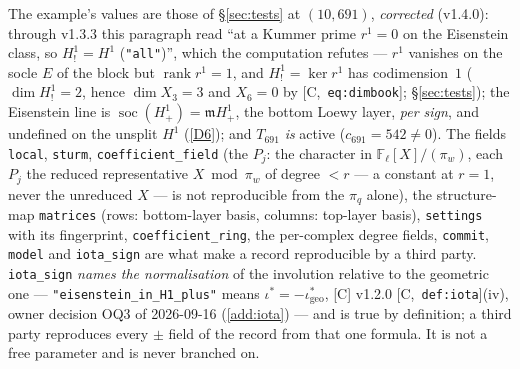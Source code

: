 \documentclass[11pt]{article}
\theoremstyle{remark}
\newcommand{\F}{\mathbb{F}}
\newcommand{\Fl}{\F_\ell}
\DeclareMathOperator{\rank}{rank}
\DeclareMathOperator{\soc}{soc}
\newcommand{\m}{\mathfrak{m}}
\newcommand{\HA}[1]{[C,~\texttt{#1}]}      %
\begin{document}
\noindent The example's values are those of \S\ref{sec:tests} at $(10,691)$, \emph{corrected}
(v1.4.0): through v1.3.3 this paragraph read ``at a Kummer prime $r^1=0$ on the Eisenstein
class, so $H^1_!=H^1$ (\texttt{"all"})'', which the computation refutes --- $r^1$ vanishes on
the socle $E$ of the block but $\rank r^1=1$, and $H^1_!=\ker r^1$ has codimension~$1$
($\dim H^1_!=2$, hence $\dim X_3=3$ and $X_6=0$ by \HA{eq:dimbook}; \S\ref{sec:tests}); the
Eisenstein line is $\soc(H^1_+)=\m H^1_+$, the bottom Loewy layer, \emph{per sign}, and
undefined on the unsplit $H^1$ (\ref{D6}); and $T_{691}$ \emph{is} active ($c_{691}=542\ne0$).
The fields \texttt{local}, \texttt{sturm}, \texttt{coefficient\_field} (the $P_j$: the
character in $\Fl[X]/(\pi_w)$, each $P_j$ the reduced representative $X\bmod\pi_w$ of degree
$<r$ --- a constant at $r=1$, never the unreduced $X$ --- is not reproducible from the $\pi_q$
alone), the structure-map \texttt{matrices} (rows: bottom-layer basis, columns: top-layer
basis), \texttt{settings} with its fingerprint, \texttt{coefficient\_ring}, the per-complex
degree fields, \texttt{commit}, \texttt{model} and \texttt{iota\_sign} are what make a record
reproducible by a third party.
\texttt{iota\_sign} \emph{names the normalisation} of the involution relative to the geometric
one --- \texttt{"eisenstein\_in\_H1\_plus"} means $\iota^{\ast}=-\iota^{\ast}_{\mathrm{geo}}$,
[C] v1.2.0 \HA{def:iota}(iv), owner decision OQ3 of 2026-09-16 (\ref{add:iota}) --- and is
true by definition; a third party reproduces every $\pm$ field of the record from that one
formula. It is not a free parameter and is never branched on.
\end{document}
